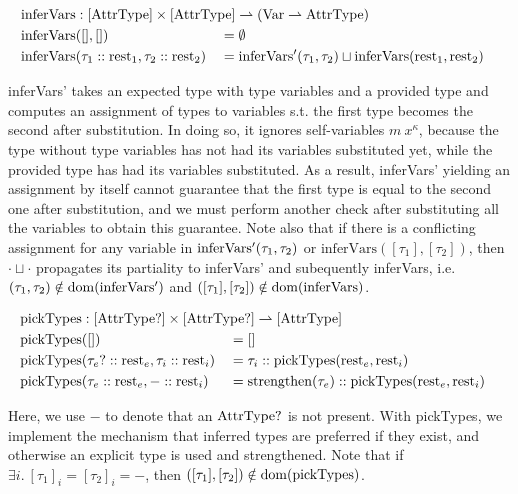 \newcommand{\inferVars}{\mathrm{inferVars}}

\begin{alignat*}{3}
	\inferVars &: \mathrlap{[\AttrType] \times [\AttrType] \rightharpoonup (\Var \rightharpoonup \AttrType)} \\
	\inferVars&([], []) &&= \emptyset \\
	\inferVars&(\tau_1 :: \rest_1, \tau_2 :: \rest_2) &&= \inferVarsDash(\tau_1, \tau_2) \sqcup \inferVars(\rest_1, \rest_2) \\
\end{alignat*}

inferVars' takes an expected type with type variables and a provided type and computes an assignment of types to variables s.t. the first type becomes the second after substitution. In doing so, it ignores self-variables $m\ x^\kappa$, because the type without type variables has not had its variables substituted yet, while the provided type has had its variables substituted. As a result, inferVars' yielding an assignment by itself cannot guarantee that the first type is equal to the second one after substitution, and we must perform another check after substituting all the variables to obtain this guarantee. Note also that if there is a conflicting assignment for any variable in $\mathrm{inferVars'}(\tau_1, \tau_2)$ or $\inferVars([\tau_1], [\tau_2])$, then $\cdot \sqcup \cdot$ propagates its partiality to inferVars' and subequently inferVars, i.e. $(\tau_1, \tau_2) \notin \mathrm{dom}(\mathrm{inferVars'})$ and $([\tau_1], [\tau_2]) \notin \dom(\inferVars)$.

\newcommand{\pickTypes}{\mathrm{pickTypes}}

\begin{alignat*}{3}
	\pickTypes &: \mathrlap{[\AttrType?] \times [\AttrType?] \rightharpoonup [\AttrType]} \\
	\pickTypes&([]) &&= [] \\
	\pickTypes&(\tau_e? :: \rest_e, \tau_i :: \rest_i) &&= \tau_i :: \pickTypes(\rest_e, \rest_i) \\
	\pickTypes&(\tau_e :: \rest_e, - :: \rest_i) &&= \strengthen(\tau_e) :: \pickTypes(\rest_e, \rest_i) \\
\end{alignat*}

Here, we use $-$ to denote that an $\mathrm{AttrType}?$ is not present.
With pickTypes, we implement the mechanism that inferred types are preferred if they exist, and otherwise an explicit type is used and strengthened. Note that if $\exists i.\ [\tau_1]_i = [\tau_2]_i = -$, then $([\tau_1], [\tau_2]) \notin \dom(\pickTypes)$.

